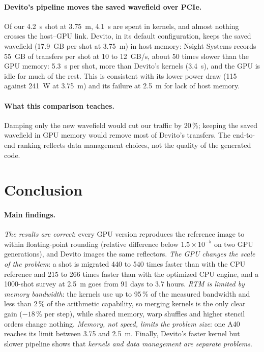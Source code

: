 \documentclass[letterpaper,11pt,leqno]{article}
\begin{document}
\paragraph{Devito's pipeline moves the saved wavefield over PCIe.} Of our 4.2~s shot at 3.75~m, 4.1~s are spent in kernels, and almost nothing crosses the host--GPU link. Devito, in its default configuration, keeps the saved wavefield (17.9~GB per shot at 3.75~m) in host memory: Nsight Systems records 55~GB of transfers per shot at 10 to 12~GB/s, about 50 times slower than the GPU memory: 5.3~s per shot, more than Devito's kernels (3.4~s), and the GPU is idle for much of the rest. This is consistent with its lower power draw (115 against 241~W at 3.75~m) and its failure at 2.5~m for lack of host memory.

\paragraph{What this comparison teaches.} Damping only the new wavefield would cut our traffic by 20\,\%; keeping the saved wavefield in GPU memory would remove most of Devito's transfers. The end-to-end ranking reflects data management choices, not the quality of the generated code.

\section{Conclusion}\label{s:conclusion}

\paragraph{Main findings.} \emph{The results are correct}: every GPU version reproduces the reference image to within floating-point rounding (relative difference below $1.5\times10^{-5}$ on two GPU generations), and Devito images the same reflectors. \emph{The GPU changes the scale of the problem}: a shot is migrated 440 to 540 times faster than with the CPU reference and 215 to 266 times faster than with the optimized CPU engine, and a 1000-shot survey at 2.5~m goes from 91 days to 3.7 hours. \emph{RTM is limited by memory bandwidth}: the kernels use up to 95\,\% of the measured bandwidth and less than 2\,\% of the arithmetic capability, so merging kernels is the only clear gain ($-18\,\%$ per step), while shared memory, warp shuffles and higher stencil orders change nothing. \emph{Memory, not speed, limits the problem size}: one A40 reaches its limit between 3.75 and 2.5~m. Finally, Devito's faster kernel but slower pipeline shows that \emph{kernels and data management are separate problems}.
\end{document}
